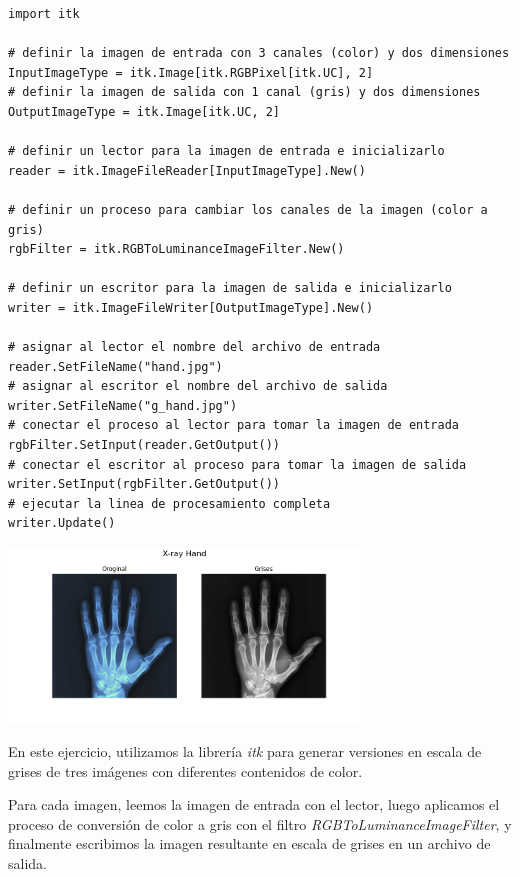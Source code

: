 \documentclass{article}
\begin{document}
\begin{lstlisting}[style=mystyle2]
import itk

# definir la imagen de entrada con 3 canales (color) y dos dimensiones
InputImageType = itk.Image[itk.RGBPixel[itk.UC], 2]
# definir la imagen de salida con 1 canal (gris) y dos dimensiones
OutputImageType = itk.Image[itk.UC, 2]

# definir un lector para la imagen de entrada e inicializarlo
reader = itk.ImageFileReader[InputImageType].New()

# definir un proceso para cambiar los canales de la imagen (color a gris)
rgbFilter = itk.RGBToLuminanceImageFilter.New()

# definir un escritor para la imagen de salida e inicializarlo
writer = itk.ImageFileWriter[OutputImageType].New()

# asignar al lector el nombre del archivo de entrada
reader.SetFileName("hand.jpg")
# asignar al escritor el nombre del archivo de salida
writer.SetFileName("g_hand.jpg")
# conectar el proceso al lector para tomar la imagen de entrada
rgbFilter.SetInput(reader.GetOutput())
# conectar el escritor al proceso para tomar la imagen de salida
writer.SetInput(rgbFilter.GetOutput())
# ejecutar la linea de procesamiento completa
writer.Update()

\end{lstlisting}
\begin{minipage}{\linewidth}
  \centering
  \includegraphics[width=0.7\textwidth]{imgs/hand.png}
  \label{referenciarImagenAca}
\end{minipage}


En este ejercicio, utilizamos la librería \textit{itk} para generar versiones en escala de grises de tres imágenes con diferentes contenidos de color. 

Para cada imagen, leemos la imagen de entrada con el lector, luego aplicamos el proceso de conversión de color a gris con el filtro \textit{RGBToLuminanceImageFilter}, y finalmente escribimos la imagen resultante en escala de grises en un archivo de salida.
\end{document}
